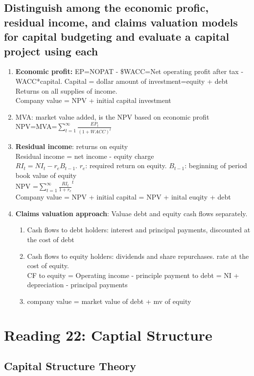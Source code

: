 \documentclass{article}
\newcommand{\be}{\begin{enumerate}}
\newcommand{\ee}{\end{enumerate}}
\begin{document}
\subsection{Distinguish among the economic profic, residual income, and claims valuation models
for capital budgeting and evaluate a capital project using each}
\be
    \item {\bf Economic profit:} EP=NOPAT - \$WACC=Net operating profit after tax
        -  WACC*capital. Capital = dollar amount of investment=equity + debt
        \\Returns on all supplies of income.
        \\Company value = NPV + initial capital investment
    \item MVA: market value added, is the NPV based on economic profit
        \\NPV=MVA=$\sum_{t=1}^{\infty}\frac{EP_t}{(1+WACC)^t}$
    \item {\bf Residual income}: returns on equity
        \\Residual income = net income - equity charge
        \\$RI_t=NI_t-r_eB_{t-1}$. $r_e$: required return on equity.
        $B_{t-1}$: beginning of period book value of equity
        \\NPV =$\sum_{t=1}^{\infty}\frac{RI_t}{1+r_e}^t$
        \\Company value = NPV + initial capital = NPV + inital euqity + debt
    \item {\bf Claims valuation approach}: Valuae debt and equity cash flows separately.
        \be
            \item Cash flows to debt holders: interest and principal payments, discounted at the cost of debt
            \item Cash flows to equity holders: dividends and share repurchases. rate at the cost of equity.
                \\ CF to equity = Operating income - principle payment to debt 
                = NI + depreciation - principal payments
            \item company value = market value of debt + mv of equity
        \ee
\ee


\section{Reading 22: Captial Structure}
\subsection{Capital Structure Theory}
\end{document}
